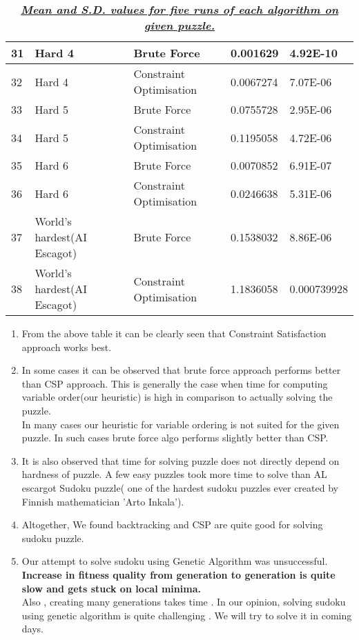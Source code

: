 \documentclass[11pt]{article}
\begin{document}
\begin{table}[!h]
\begin{tabular}{|l|l|l|l|l|}
31             & Hard 4                      & Brute Force              & 0.001629          & 4.92E-10                    \\ \hline
32             & Hard 4                      & Constraint  Optimisation & 0.0067274         & 7.07E-06                    \\ \hline
33             & Hard 5                      & Brute Force              & 0.0755728         & 2.95E-06                    \\ \hline
34             & Hard 5                      & Constraint  Optimisation & 0.1195058         & 4.72E-06                    \\ \hline
35             & Hard 6                      & Brute Force              & 0.0070852         & 6.91E-07                    \\ \hline
36             & Hard 6                      & Constraint  Optimisation & 0.0246638         & 5.31E-06                    \\ \hline
37             & World's hardest(AI Escagot) & Brute Force              & 0.1538032         & 8.86E-06                    \\ \hline
38             & World's hardest(AI Escagot) & Constraint  Optimisation & 1.1836058         & 0.000739928                 \\ \hline
\end{tabular}
\caption{\emph{\underline{\textbf{Mean and S.D. values for five runs of each algorithm on given puzzle.}}}}
\label{my-label}
\end{table}

\begin{enumerate}[label = (\Roman*)]
\item From the above table it can be clearly seen that Constraint Satisfaction approach works best.
\item In some cases it can be observed that brute force approach performs better than CSP approach. This is generally the case when time for computing variable order(our heuristic) is high in comparison to actually solving the puzzle.\\ 
	In many cases our heuristic for variable ordering is not suited for the given puzzle. In such cases brute force algo performs slightly better than CSP.
\item It is also observed that time for solving puzzle does not directly depend on hardness of puzzle. A few easy puzzles took more time to solve than AL escargot Sudoku puzzle( one of the hardest sudoku puzzles ever created by Finnish mathematician 'Arto Inkala').
\item Altogether, We found backtracking and CSP are quite good for solving sudoku puzzle. 
\item Our attempt to solve sudoku using Genetic Algorithm was unsuccessful. \textbf{Increase in fitness quality from generation to generation is quite slow and gets stuck on local minima.}\\
	Also , creating many generations takes time . In our opinion, solving sudoku using genetic algorithm is quite challenging .
We will try to solve it in coming days.
\end{enumerate}
\end{document}
